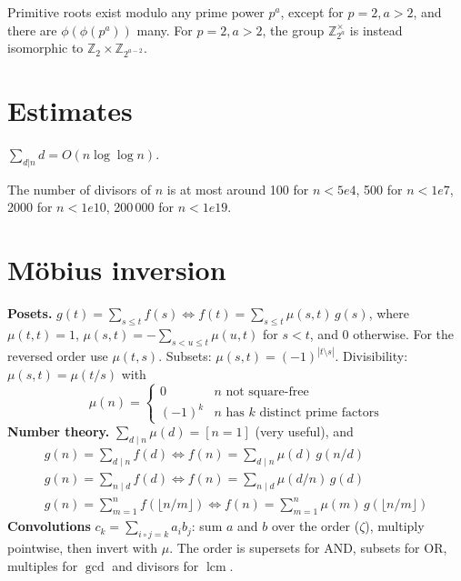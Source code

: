 	Primitive roots exist modulo any prime power $p^a$, except for $p = 2, a > 2$, and there are $\phi(\phi(p^a))$ many.
	For $p = 2, a > 2$, the group $\mathbb Z_{2^a}^\times$ is instead isomorphic to $\mathbb Z_2 \times \mathbb Z_{2^{a-2}}$.

\section{Estimates}
	$\sum_{d|n} d = O(n \log \log n)$.

	The number of divisors of $n$ is at most around 100 for $n < 5e4$, 500 for $n < 1e7$, 2000 for $n < 1e10$, 200\,000 for $n < 1e19$.

\section{Möbius inversion}
\textbf{Posets.} $g(t) = \sum_{s \le t} f(s) \iff f(t) = \sum_{s \le t} \mu(s, t)\, g(s)$, where
$\mu(t, t) = 1$, $\mu(s, t) = -\sum_{s < u \le t} \mu(u, t)$ for $s < t$, and $0$ otherwise.
For the reversed order use $\mu(t, s)$. Subsets: $\mu(s, t) = (-1)^{|t \setminus s|}$.
Divisibility: $\mu(s, t) = \mu(t/s)$ with
\[ \mu(n) = \begin{cases} 0 & n \text{ not square-free} \\ (-1)^k & n \text{ has } k \text{ distinct prime factors} \end{cases} \]
\textbf{Number theory.} $\sum_{d \mid n} \mu(d) = [n = 1]$ (very useful), and
\begin{gather*}
g(n) = \textstyle\sum_{d \mid n} f(d) \iff f(n) = \sum_{d \mid n} \mu(d)\, g(n/d) \\
g(n) = \textstyle\sum_{n \mid d} f(d) \iff f(n) = \sum_{n \mid d} \mu(d/n)\, g(d) \\
g(n) = \textstyle\sum_{m=1}^{n} f(\lfloor n/m \rfloor) \iff f(n) = \sum_{m=1}^{n} \mu(m)\, g(\lfloor n/m \rfloor)
\end{gather*}
\textbf{Convolutions} $c_k = \sum_{i \circ j = k} a_i b_j$: sum $a$ and $b$ over the order ($\zeta$),
multiply pointwise, then invert with $\mu$. The order is supersets for AND, subsets for OR,
multiples for $\gcd$ and divisors for $\operatorname{lcm}$.